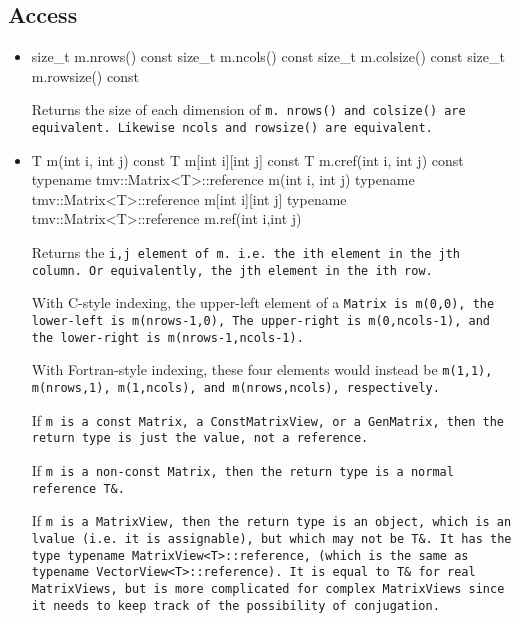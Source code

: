 \subsection{Access}
\label{Matrix_Access}

\begin{itemize}
\item
\begin{tmvcode}
size_t m.nrows() const
size_t m.ncols() const
size_t m.colsize() const
size_t m.rowsize() const
\end{tmvcode}
Returns the size of each dimension of \tt{m}.  \tt{nrows()} and \tt{colsize()} are equivalent.
Likewise \tt{ncols} and \tt{rowsize()} are equivalent.

\item
\begin{tmvcode}
T m(int i, int j) const
T m[int i][int j] const
T m.cref(int i, int j) const
typename tmv::Matrix<T>::reference m(int i, int j)
typename tmv::Matrix<T>::reference m[int i][int j]
typename tmv::Matrix<T>::reference m.ref(int i,int j)
\end{tmvcode}
Returns the \tt{i,j} element of \tt{m}. i.e. the \tt{i}th element in the 
\tt{j}th column.  Or
equivalently, the \tt{j}th element in the \tt{i}th row. 

With C-style indexing, the upper-left element
of a \tt{Matrix} is \tt{m(0,0)}, the lower-left is \tt{m(nrows-1,0)},
The upper-right is \tt{m(0,ncols-1)}, and the lower-right is
\tt{m(nrows-1,ncols-1)}.

With Fortran-style indexing, these four elements would instead be
\tt{m(1,1)}, \tt{m(nrows,1)}, \tt{m(1,ncols)}, and \tt{m(nrows,ncols)},
respectively.

If \tt{m} is a 
\tt{const Matrix}, a \tt{ConstMatrixView}, or a \tt{GenMatrix}, 
then the return type is just the value, not a reference.

If \tt{m} is a 
non-\tt{const Matrix}, then the return type is a normal reference \tt{T\&}.

If \tt{m} is a \tt{MatrixView}, then the return type is an object,
which is an lvalue (i.e. it is assignable), but which may not be \tt{T\&}.
It has the type \tt{typename MatrixView<T>::reference}, 
(which is the same as \tt{typename VectorView<T>::reference}).
It is equal to \tt{T\&} for real \tt{MatrixView}s, but is
more complicated for complex \tt{MatrixView}s since it needs to 
keep track of the possibility of conjugation.


\end{itemize}
